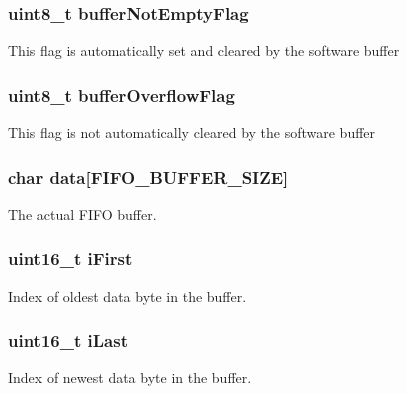 \subsubsection[{buffer\+Not\+Empty\+Flag}]{\setlength{\rightskip}{0pt plus 5cm}uint8\+\_\+t buffer\+Not\+Empty\+Flag}\label{structswFifoBuffer__t_aba90ad8f44ca440bd612c44382c8e144}
This flag is automatically set and cleared by the software buffer \hypertarget{structswFifoBuffer__t_a7622d9e973da2062ff513cdc76f1d933}{}
\subsubsection[{buffer\+Overflow\+Flag}]{\setlength{\rightskip}{0pt plus 5cm}uint8\+\_\+t buffer\+Overflow\+Flag}\label{structswFifoBuffer__t_a7622d9e973da2062ff513cdc76f1d933}
This flag is not automatically cleared by the software buffer \hypertarget{structswFifoBuffer__t_a1403b7b4337149b3c95e6f17561c621c}{}
\subsubsection[{data}]{\setlength{\rightskip}{0pt plus 5cm}char data\mbox{[}{\bf F\+I\+F\+O\+\_\+\+B\+U\+F\+F\+E\+R\+\_\+\+S\+I\+Z\+E}\mbox{]}}\label{structswFifoBuffer__t_a1403b7b4337149b3c95e6f17561c621c}
The actual F\+I\+F\+O buffer. \hypertarget{structswFifoBuffer__t_aff41afe29075c1ce77eebb0ef1811a15}{}
\subsubsection[{i\+First}]{\setlength{\rightskip}{0pt plus 5cm}uint16\+\_\+t i\+First}\label{structswFifoBuffer__t_aff41afe29075c1ce77eebb0ef1811a15}
Index of oldest data byte in the buffer. \hypertarget{structswFifoBuffer__t_ab32da8ee445dbe861a5c5a244c5d3691}{}
\subsubsection[{i\+Last}]{\setlength{\rightskip}{0pt plus 5cm}uint16\+\_\+t i\+Last}\label{structswFifoBuffer__t_ab32da8ee445dbe861a5c5a244c5d3691}
Index of newest data byte in the buffer. \hypertarget{structswFifoBuffer__t_a625d064298a0c5f99429e3be56b16f18}{}

